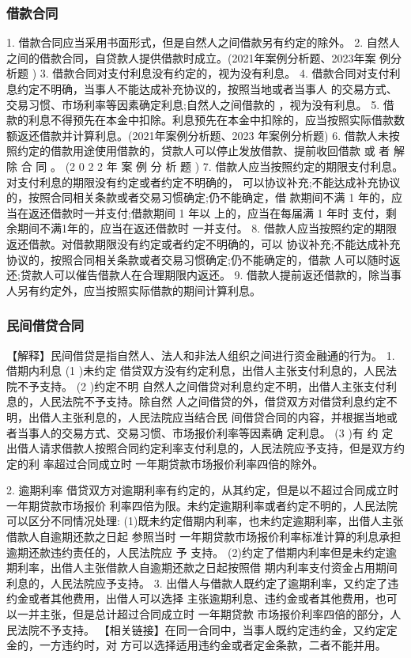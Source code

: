 \documentclass[UTF8,12pt]{ctexart}
\numberwithin{equation}{section} %
\numberwithin{figure}{section}
\numberwithin{table}{section}
\begin{document}
	\subsubsection{借款合同}
	
	1. 借款合同应当采用书面形式，但是自然人之间借款另有约定的除外。
	2. 自然人之间的借款合同，自贷款人提供借款时成立。(2021年案例分析题、2023年案 例分析题 )
	3. 借款合同对支付利息没有约定的，视为没有利息。
	4. 借款合同对支付利息约定不明确，当事人不能达成补充协议的，按照当地或者当事人 的交易方式、交易习惯、市场利率等因素确定利息;自然人之间借款的 ，视为没有利息。
	5. 借款的利息不得预先在本金中扣除。利息预先在本金中扣除的，应当按照实际借款数 额返还借款并计算利息。(2021年案例分析题、2023 年案例分析题)
	6. 借款人未按照约定的借款用途使用借款的，贷款人可以停止发放借款、提前收回借款 或 者 解 除 合 同 。 (2 0 2 2 年 案 例 分 析 题 )
	7. 借款人应当按照约定的期限支付利息。对支付利息的期限没有约定或者约定不明确的， 可以协议补充;不能达成补充协议的，按照合同相关条款或者交易习惯确定;仍不能确定，借 款期间不满 1 年的，应当在返还借款时一并支付;借款期间 1 年以 上的，应当在每届满 1 年时 支付，剩余期间不满1年的，应当在返还借款时 一并支付。
	8. 借款人应当按照约定的期限返还借款。对借款期限没有约定或者约定不明确的，可以 协议补充;不能达成补充协议的，按照合同相关条款或者交易习惯确定;仍不能确定的，借款 人可以随时返还;贷款人可以催告借款人在合理期限内返还。
	9. 借款人提前返还借款的，除当事人另有约定外，应当按照实际借款的期间计算利息。
	
	
	\subsubsection{民间借贷合同}
	【解释】民间借贷是指自然人、法人和非法人组织之间进行资金融通的行为。
	1. 借期内利息
	(1 )未约定
	借贷双方没有约定利息，出借人主张支付利息的，人民法院不予支持。
	(2 )约定不明 自然人之间借贷对利息约定不明，出借人主张支付利息的，人民法院不予支持。除自然 人之间借贷的外，借贷双方对借贷利息约定不明，出借人主张利息的，人民法院应当结合民 间借贷合同的内容，并根据当地或者当事人的交易方式、交易习惯、市场报价利率等因素确 定利息。
	(3 )有 约 定 出借人请求借款人按照合同约定利率支付利息的，人民法院应予支持，但是双方约定的利 率超过合同成立时 一年期贷款市场报价利率四倍的除外。
	
	2. 逾期利率
	借贷双方对逾期利率有约定的，从其约定，但是以不超过合同成立时 一年期贷款市场报价 利率四倍为限。未约定逾期利率或者约定不明的，人民法院可以区分不同情况处理: (1)既未约定借期内利率，也未约定逾期利率，出借人主张借款人自逾期还款之日起 参照当时 一年期贷款市场报价利率标准计算的利息承担逾期还款违约责任的，人民法院应 予
	支持。 (2)约定了借期内利率但是未约定逾期利率，出借人主张借款人自逾期还款之日起按照借 期内利率支付资金占用期间利息的，人民法院应予支持。
	3. 出借人与借款人既约定了逾期利率，又约定了违约金或者其他费用，出借人可以选择 主张逾期利息、违约金或者其他费用，也可以一并主张，但是总计超过合同成立时 一年期贷款 市场报价利率四倍的部分，人民法院不予支持。
	【相关链接】在同一合同中，当事人既约定违约金，又约定定金的，一方违约时，对 方可以选择适用违约金或者定金条款，二者不能并用。
	
\end{document}
